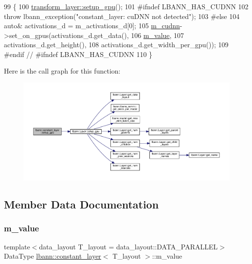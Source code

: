\begin{DoxyCode}
99                             \{
100     \hyperlink{classlbann_1_1Layer_a36aa22ef90ce4de65abe729d38490863}{transform\_layer::setup\_gpu}();
101 \textcolor{preprocessor}{  #ifndef LBANN\_HAS\_CUDNN}
102     \textcolor{keywordflow}{throw} lbann\_exception(\textcolor{stringliteral}{"constant\_layer: cuDNN not detected"});
103 \textcolor{preprocessor}{  #else}
104     \textcolor{keyword}{auto}& activations\_d = m\_activations\_d[0];
105     \hyperlink{classlbann_1_1Layer_a08dbb94239e3b8c96329786c57c72e21}{m\_cudnn}->set\_on\_gpus(activations\_d.get\_data(),
106                          \hyperlink{classlbann_1_1constant__layer_a8cdb9c854777cc29f1cf1f60da64ef4e}{m\_value},
107                          activations\_d.get\_height(),
108                          activations\_d.get\_width\_per\_gpu());
109 \textcolor{preprocessor}{  #endif // #ifndef LBANN\_HAS\_CUDNN}
110   \}
\end{DoxyCode}
Here is the call graph for this function\+:\nopagebreak
\begin{figure}[H]
\begin{center}
\leavevmode
\includegraphics[width=350pt]{classlbann_1_1constant__layer_aa3450d358b093a29067500acc0ac4dff_cgraph}
\end{center}
\end{figure}


\subsection{Member Data Documentation}
\mbox{\label{classlbann_1_1constant__layer_a8cdb9c854777cc29f1cf1f60da64ef4e}} 
\subsubsection{\texorpdfstring{m\+\_\+value}{m\_value}}
{\footnotesize\ttfamily template$<$data\+\_\+layout T\+\_\+layout = data\+\_\+layout\+::\+D\+A\+T\+A\+\_\+\+P\+A\+R\+A\+L\+L\+EL$>$ \\
Data\+Type \hyperlink{classlbann_1_1constant__layer}{lbann\+::constant\+\_\+layer}$<$ T\+\_\+layout $>$\+::m\+\_\+value\hspace{0.3cm}{\ttfamily [private]}}

